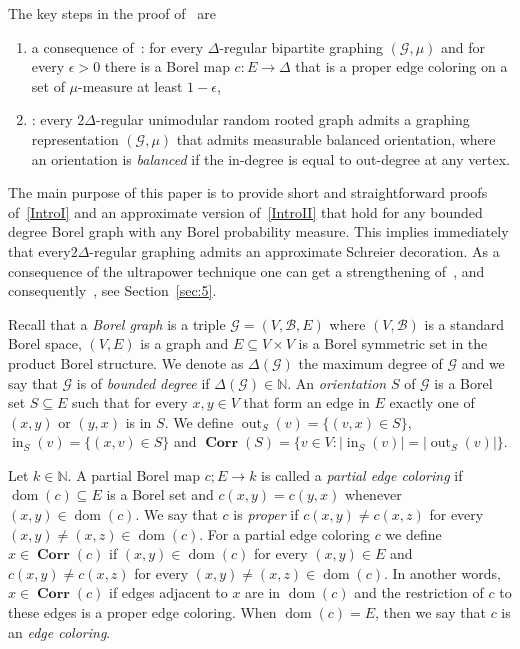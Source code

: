 \documentclass[10pt]{amsart}
\theoremstyle{definition}
\DeclareMathOperator{\Corr}{\mathbf{Corr}}
\DeclareMathOperator{\out}{out}
\DeclareMathOperator{\inn}{in}
\DeclareMathOperator{\dom}{dom}
\newcommand{\clG}{\mathcal{G}}
\newcommand{\clB}{\mathcal{B}}
\newcommand{\bbZ}{\mathbb{N}}
\newcommand*{\Romanenumi}{\renewcommand*{\theenumi}{\Roman{enumi}}}
\begin{document}
The key steps in the proof of~\cite[Theorem~1]{Laszlo} are
\begin{enumerate}\Romanenumi
\item\label{IntroI} a consequence of~\cite[Theorem~3]{Laszlo}: for every $\Delta$-regular bipartite graphing $(\clG,\mu)$ and for every $\epsilon>0$ there is a Borel map $c:E\to \Delta$ that is a proper edge coloring on a set of $\mu$-measure at least $1-\epsilon$,
\item\label{IntroII} \cite[Theorem~2]{Laszlo}: every $2\Delta$-regular unimodular random rooted graph admits a graphing representation $(\clG,\mu)$ that admits measurable balanced orientation, where an orientation is \emph{balanced} if the in-degree is equal to out-degree at any vertex.
\end{enumerate}

The main purpose of this paper is to provide short and straightforward proofs of~\eqref{IntroI} and an approximate version of~\eqref{IntroII} that hold for any bounded degree Borel graph with any Borel probability measure. This implies immediately that every\linebreak $2\Delta$-regular graphing admits an approximate Schreier decoration. As a consequence of the ultrapower technique one can get a strengthening of~\cite[Corollary~4]{Laszlo}, and consequently~\cite[Theorem~1]{Laszlo}, see Section~\ref{sec:5}.

Recall that a \emph{Borel graph} is a triple $\clG=(V,\clB,E)$ where $(V,\clB)$ is a standard Borel space, $(V,E)$ is a graph and $E\subseteq V\times V$ is a Borel symmetric set in the product Borel structure. We denote as $\Delta(\clG)$ the maximum degree of $\clG$ and we say that $\clG$ is of \emph{bounded degree} if $\Delta(\clG)\in \bbZ$. An \emph{orientation} $S$ of $\clG$ is a Borel set $S\subseteq E$ such that for every $x,y\in V$ that form an edge in $E$ exactly one of $(x,y)$ or $(y,x)$ is in $S$. We define $\out_S(v)=\{(v,x)\in S\}$, $\inn_S(v)=\{(x,v)\in S\}$ and $\Corr(S)=\{v\in V:|\inn_S(v)|=|\out_S(v)|\}$.

Let $k\in \bbZ$. A partial Borel map $c;E\to k$ is called a \emph{partial edge coloring} if $\dom(c)\subseteq E$ is a Borel set and $c(x,y)=c(y,x)$ whenever $(x,y)\in \dom(c)$. We say that $c$ is \emph{proper} if $c(x,y)\not =c(x,z)$ for every $(x,y)\not=(x,z)\in \dom(c)$. For a partial edge coloring $c$ we define $x\in \Corr(c)$ if $(x,y)\in\dom(c)$ for every $(x,y)\in E$ and $c(x,y)\not =c(x,z)$ for every $(x,y)\not=(x,z)\in \dom(c)$. In another words, $x\in \Corr(c)$ if edges adjacent to $x$ are in $\dom(c)$ and the restriction of $c$ to these edges is a proper edge coloring. When $\dom(c)=E$, then we say that $c$ is an \emph{edge coloring}.
\end{document}
